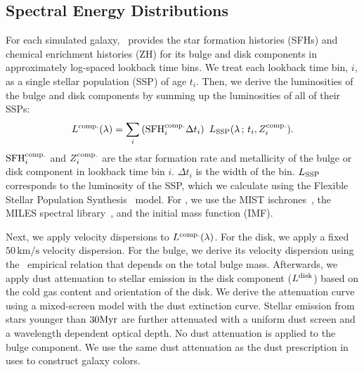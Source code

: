 
\subsection{Spectral Energy Distributions} \label{sec:sed}
For each simulated galaxy, \lgal~provides the star formation histories (SFHs)
and chemical enrichment histories (ZH) for its bulge and disk components in 
approximately log-spaced lookback time bins. %
We treat each lookback time bin, $i$, as a single stellar population (SSP) of
age $t_i$.
Then, we derive the luminosities of the bulge and disk components by summing up
the luminosities of all of their SSPs:
\begin{equation}
    L^{\rm comp.}(\lambda) = \sum \limits_i \left({\rm SFH}^{\rm comp.}_i
    \Delta t_i\right)~L_{\rm SSP}(\lambda\,;\, t_i, Z^{\rm comp.}_i). 
\end{equation}
${\rm SFH}^{\rm comp.}_i$ and $Z^{\rm comp.}_i$ are the star formation rate and
metallicity of the bulge or disk component in lookback time bin $i$. 
$\Delta t_i$ is the width of the bin. 
$L_{\rm SSP}$ corresponds to the luminosity of the SSP, which we calculate
using the Flexible Stellar Population Synthesis~\citep[\fsps][]{conroy2009,
conroy2010c} model.
For \fsps, we use the MIST ischrones~\citep{paxton2011, paxton2013, paxton2015,
choi2016, dotter2016}, the MILES spectral library~\citep{sanchez-blazquez2006},
and the \cite{chabrier2003} initial mass function (IMF). 

Next, we apply velocity dispersions to $L^{\rm comp.}(\lambda)$.
For the disk, we apply a fixed $50\,\mathrm{km/s}$ velocity dispersion. 
For the bulge, we derive its velocity dispersion using the~\cite{zahid2016}
empirical relation that depends on the total bulge mass.
Afterwards, we apply dust attenuation to stellar emission in the disk component
($L^{\rm disk}$) based on the cold gas content and orientation of the disk. 
We derive the attenuation curve using a mixed-screen model with the
\cite{mathis1983} dust extinction curve. 
Stellar emission from stars younger than $30{\rm Myr}$ are further attenuated
with a uniform dust screen and a wavelength dependent optical depth.
No dust attenuation is applied to the bulge component.
We use the same dust attenuation as the dust prescription in
\cite{henriques2015} uses to construct galaxy colors. 

